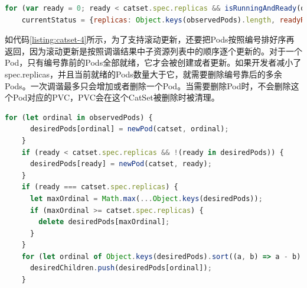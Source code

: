 \documentclass[macfonts,master]{njuthesis}
\begin{document}
\begin{lstlisting}[language=JavaScript,caption=设置当前状态（status）,label=listing:catset-3,gobble=4]
    for (var ready = 0; ready < catset.spec.replicas && isRunningAndReady(observedPods[ready]); ready++);
    currentStatus = {replicas: Object.keys(observedPods).length, readyReplicas: ready};
\end{lstlisting}

如代码\ref{listing:catset-4}所示，为了支持滚动更新，还要把Pods按照编号排好序再返回，因为滚动更新是按照调谐结果中子资源列表中的顺序逐个更新的。对于一个Pod，只有编号靠前的Pods全部就绪，它才会被创建或者更新。如果开发者减小了spec.replicas，并且当前就绪的Pods数量大于它，就需要删除编号靠后的多余Pods。一次调谐最多只会增加或者删除一个Pod。当需要删除Pod时，不会删除这个Pod对应的PVC，PVC会在这个CatSet被删除时被清理。

\begin{lstlisting}[language=JavaScript,caption=返回的Pods,label=listing:catset-4,gobble=4]
    for (let ordinal in observedPods) {
      desiredPods[ordinal] = newPod(catset, ordinal);
    }
    if (ready < catset.spec.replicas && !(ready in desiredPods)) {
      desiredPods[ready] = newPod(catset, ready);
    }
    if (ready === catset.spec.replicas) {
      let maxOrdinal = Math.max(...Object.keys(desiredPods));
      if (maxOrdinal >= catset.spec.replicas) {
        delete desiredPods[maxOrdinal];
      }
    }
    for (let ordinal of Object.keys(desiredPods).sort((a, b) => a - b).reverse()) {
      desiredChildren.push(desiredPods[ordinal]);
    }
\end{lstlisting}
\end{document}
